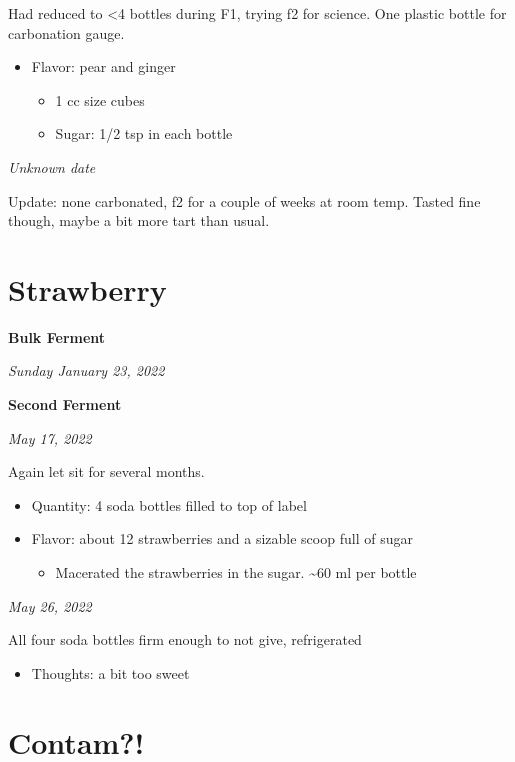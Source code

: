 \documentclass[
]{book}
\providecommand{\tightlist}{%
  \setlength{\itemsep}{0pt}\setlength{\parskip}{0pt}}
\begin{document}
Had reduced to \textless4 bottles during F1, trying f2 for science. One plastic bottle for carbonation gauge.

\begin{itemize}
\tightlist
\item
  Flavor: pear and ginger

  \begin{itemize}
  \tightlist
  \item
    1 cc size cubes
  \item
    Sugar: 1/2 tsp in each bottle
  \end{itemize}
\end{itemize}

\emph{Unknown date}

Update: none carbonated, f2 for a couple of weeks at room temp. Tasted fine though, maybe a bit more tart than usual.

\hypertarget{strawberry}{%
\section{Strawberry}\label{strawberry}}

\textbf{Bulk Ferment}

\emph{Sunday January 23, 2022}

\textbf{Second Ferment}

\emph{May 17, 2022}

Again let sit for several months.

\begin{itemize}
\tightlist
\item
  Quantity: 4 soda bottles filled to top of label
\item
  Flavor: about 12 strawberries and a sizable scoop full of sugar

  \begin{itemize}
  \tightlist
  \item
    Macerated the strawberries in the sugar. \textasciitilde60 ml per bottle
  \end{itemize}
\end{itemize}

\emph{May 26, 2022}

All four soda bottles firm enough to not give, refrigerated

\begin{itemize}
\tightlist
\item
  Thoughts: a bit too sweet
\end{itemize}

\hypertarget{contam}{%
\section{Contam?!}\label{contam}}
\end{document}
